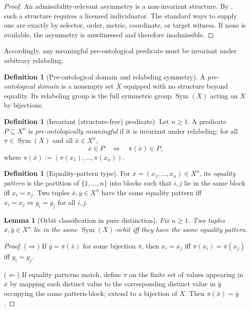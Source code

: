 \documentclass[11pt]{article}
\newtheorem{lemma}[theorem]{Lemma}
\theoremstyle{definition}
\newtheorem{definition}[theorem]{Definition}
\begin{document}
\begin{proof}
An admissibility-relevant asymmetry is a non-invariant structure.
By , such a structure requires a licensed individuator.
The standard ways to supply one are exactly by selector, order, metric, coordinate, or target witness.
If none is available, the asymmetry is unwitnessed and therefore inadmissible.
\end{proof}

Accordingly, any meaningful pre-ontological predicate must be invariant under arbitrary relabeling.

\begin{definition}[Pre-ontological domain and relabeling symmetry]
\label{def:preont-domain}
A \emph{pre-ontological domain} is a nonempty set $X$ equipped with no structure beyond equality.
Its relabeling group is the full symmetric group $\operatorname{Sym}(X)$ acting on $X$ by bijections.
\end{definition}

\begin{definition}[Invariant (structure-free) predicate]
\label{def:invariant-predicate}
Let $n\ge 1$. A predicate $P\subseteq X^n$ is \emph{pre-ontologically meaningful} if it is invariant under relabeling:
for all $\pi\in\operatorname{Sym}(X)$ and all $\bar x\in X^n$,
\[
\bar x\in P \quad\Longleftrightarrow\quad \pi(\bar x)\in P,
\]
where $\pi(\bar x):=(\pi(x_1),\ldots,\pi(x_n))$.
\end{definition}

\begin{definition}[Equality-pattern type]
\label{def:equality-pattern}
For $\bar x=(x_1,\ldots,x_n)\in X^n$, its \emph{equality pattern} is the partition of $\{1,\ldots,n\}$ into blocks
such that $i,j$ lie in the same block iff $x_i=x_j$.
Two tuples $\bar x,\bar y\in X^n$ have the same equality pattern iff
$x_i=x_j \Leftrightarrow y_i=y_j$ for all $i,j$.
\end{definition}

\begin{lemma}[Orbit classification in pure distinction]
\label{lem:orbit-classification}
Fix $n\ge 1$. Two tuples $\bar x,\bar y\in X^n$ lie in the same $\operatorname{Sym}(X)$-orbit
iff they have the same equality pattern.
\end{lemma}

\begin{proof}
($\Rightarrow$) If $\bar y=\pi(\bar x)$ for some bijection $\pi$, then $x_i=x_j$ iff $\pi(x_i)=\pi(x_j)$ iff $y_i=y_j$.

($\Leftarrow$) If equality patterns match, define $\pi$ on the finite set of values appearing in $\bar x$ by mapping each
distinct value to the corresponding distinct value in $\bar y$ occupying the same pattern-block; extend to a bijection of $X$.
Then $\pi(\bar x)=\bar y$.
\end{proof}
\end{document}
